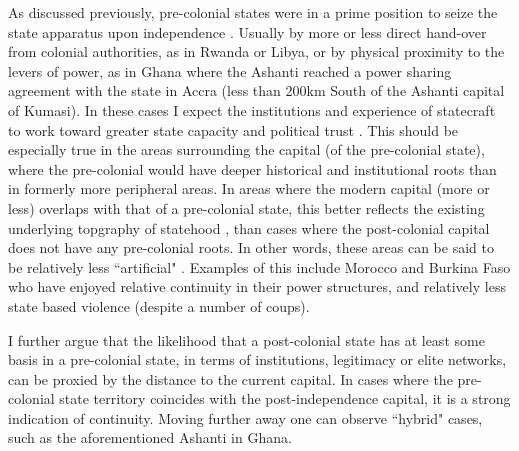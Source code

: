 \documentclass[12pt]{article}
\begin{document}
As discussed previously, pre-colonial states were in a prime position to seize
the state apparatus upon independence \citep{Paine2019}. Usually by more or less
direct hand-over from colonial authorities, as in Rwanda or Libya, or by
physical proximity to the levers of power, as in Ghana where the Ashanti reached
a power sharing agreement with the state in Accra (less than 200km South of the
Ashanti capital of Kumasi). In these cases I expect the institutions and
experience of statecraft to work toward greater state capacity and political
trust \citep{Depetris-Chauvin2016}. This should be especially true in the areas
surrounding the capital (of the pre-colonial state), where the pre-colonial
would have deeper historical and institutional roots than in formerly more
peripheral areas. In areas where the modern capital (more or less) overlaps with
that of a pre-colonial state, this better reflects the existing underlying
topgraphy of statehood , than cases where the post-colonial capital does not
have any pre-colonial roots. In other words, these areas can be said to be
relatively less ``artificial" \citep{Alesina2011}. Examples of this include
Morocco and Burkina Faso who have enjoyed relative continuity in their power
structures, and relatively less state based violence (despite a number of
coups). 

I further argue that the likelihood that a post-colonial state has at least some
basis in a pre-colonial state, in terms of institutions, legitimacy or elite
networks, can be proxied by the distance to the current capital. In cases where
the pre-colonial state territory coincides with the post-independence capital, it
is a strong indication of continuity. Moving further away one can observe
``hybrid" cases, such as the aforementioned Ashanti in Ghana. 


\end{document}
